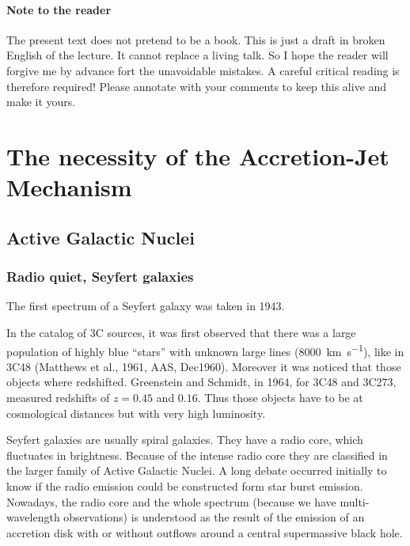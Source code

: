 \documentclass[10pt,a4paper,english]{article}
\begin{document}

\paragraph{Note to the reader}
The present text does not pretend to be a book. This is just a draft in broken
English of the lecture. It cannot replace a living talk. So I hope the reader
will forgive me by advance fort the unavoidable mistakes. A careful critical
reading is therefore required! Please annotate with your comments to keep this
alive and make it yours.

\tableofcontents

\newpage
{} %


\section{The necessity of the Accretion-Jet Mechanism}

\subsection{Active Galactic Nuclei}

\subsubsection{Radio quiet, Seyfert galaxies}

The first spectrum of a Seyfert galaxy was taken in 1943.


In the catalog of 3C sources, it was first observed that there was a large
population of highly blue “stars” with unknown large lines
(\SI{8000}{\km\per\s}), like in 3C48 (Matthews et al., 1961, AAS, Dec1960).
Moreover it was noticed that those objects where redshifted. Greenstein and
Schmidt, in 1964, for 3C48 and 3C273, measured redshifts of $z=0.45$ and
$0.16$. Thus those objects have to be at cosmological distances but with very
high luminosity.


Seyfert galaxies are usually spiral galaxies. They have a radio core, which
fluctuates in brightness. Because of the intense radio core they are classified
in the larger family of Active Galactic Nuclei. A long debate occurred
initially to know if the radio emission could be constructed form star burst
emission. Nowadays, the radio core and the whole spectrum (because we have
multi-wavelength observations) is understood as the result of the emission of
an accretion disk with or without outflows around a central supermassive black
hole.
\end{document}
